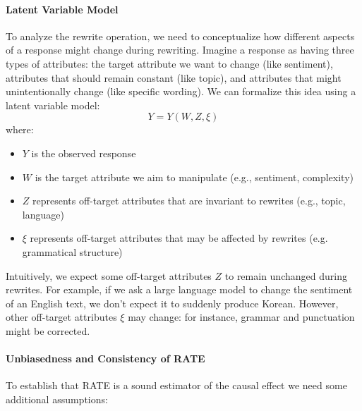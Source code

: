 \documentclass{article}
\begin{document}
\paragraph{Latent Variable Model}
To analyze the rewrite operation, we need to conceptualize how different aspects of a response might change during rewriting. Imagine a response as having three types of attributes: the target attribute we want to change (like sentiment), attributes that should remain constant (like topic), and attributes that might unintentionally change (like specific wording). We can formalize this idea using a latent variable model:
\[ Y = Y(W, Z, \xi) \]
where:
\begin{itemize}
  \item $Y$ is the observed response
  \item $W$ is the target attribute we aim to manipulate (e.g., sentiment, complexity)
  \item $Z$ represents off-target attributes that are invariant to rewrites (e.g., topic, language)
  \item $\xi$ represents off-target attributes that may be affected by rewrites (e.g. grammatical structure)
\end{itemize}

Intuitively, we expect some off-target attributes $Z$ to remain unchanged during rewrites. For example, if we ask a large language model to change the sentiment of an English text, we don't expect it to suddenly produce Korean. However, other off-target attributes $\xi$ may change: for instance, grammar and punctuation might be corrected.

\paragraph{Unbiasedness and Consistency of RATE}
To establish that RATE is a sound estimator of the causal effect we need some additional assumptions:
\end{document}
